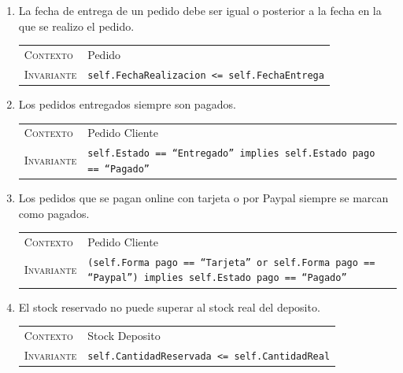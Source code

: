 \begin{enumerate}
     \item La fecha de entrega de un pedido debe ser igual o posterior a la fecha en la que se realizo el pedido.

    \begin{center}
    \begin{tabular}{p{} p{}}
        \textsc{Contexto} & Pedido \\
        \textsc{Invariante} & \texttt{self.FechaRealizacion <= self.FechaEntrega} \\
    \end{tabular}
    \end{center}
    
    \item Los pedidos entregados siempre son pagados.
    
    \begin{center}
    \begin{tabular}{p{} p{}}
        \textsc{Contexto} & Pedido Cliente \\
        \textsc{Invariante} & \texttt{self.Estado == ``Entregado'' implies self.Estado pago == ``Pagado''} \\
    \end{tabular}
    \end{center}
    
    \item Los pedidos que se pagan online con tarjeta o por Paypal siempre se marcan como pagados.
    
    \begin{center}
    \begin{tabular}{p{} p{}}
        \textsc{Contexto} & Pedido Cliente \\
        \textsc{Invariante} & \texttt{(self.Forma pago == ``Tarjeta'' or self.Forma pago == ``Paypal'') implies self.Estado pago == ``Pagado''} \\
    \end{tabular}
    \end{center}
    
    \item El stock reservado no puede superar al stock real del deposito.
    
    \begin{center}
    \begin{tabular}{p{} p{}}
        \textsc{Contexto} & Stock Deposito \\
        \textsc{Invariante} & \texttt{self.CantidadReservada <= self.CantidadReal} \\
    \end{tabular}
    \end{center}
    

\end{enumerate}

